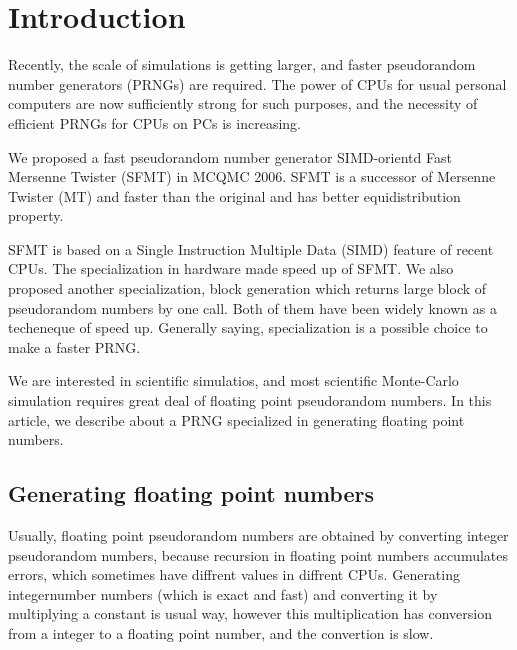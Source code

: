 \documentclass{svmult}
\begin{document}
\section {Introduction}
\label{sec:intro}

Recently, the scale of simulations is getting larger, and faster
pseudorandom number generators (PRNGs) are required. The power of CPUs
for usual personal computers are now sufficiently strong for such
purposes, and the necessity of efficient PRNGs for CPUs on PCs is
increasing.

We proposed a fast pseudorandom number generator SIMD-orientd Fast
Mersenne Twister (SFMT) \cite{SFMT} in MCQMC 2006.  SFMT is a successor
of Mersenne Twister (MT) \cite{MT} and faster than the original and
has better equidistribution property.

SFMT is based on a Single Instruction Multiple Data (SIMD) \cite{SIMD}
feature of recent CPUs. The specialization in hardware made speed up
of SFMT. We also proposed another specialization, block generation
which returns large block of pseudorandom numbers by one call.  
Both of them have been widely known as a techeneque of speed up.
Generally saying, specialization is a possible choice to
make a faster PRNG.

We are interested in scientific simulatios, and most scientific
Monte-Carlo simulation requires great deal of floating point
pseudorandom numbers.  In this article, we describe about a PRNG
specialized in generating floating point numbers.

\subsection{Generating floating point numbers}
\label{sec:floating}

Usually, floating point pseudorandom numbers are obtained by
converting integer pseudorandom numbers, because recursion in floating
point numbers accumulates errors, which sometimes have diffrent values
in diffrent CPUs. Generating integernumber numbers (which is exact and
fast) and converting it by multiplying a constant is usual way,
however this multiplication has conversion from a integer to
a floating point number, and the convertion is slow.
\end{document}
